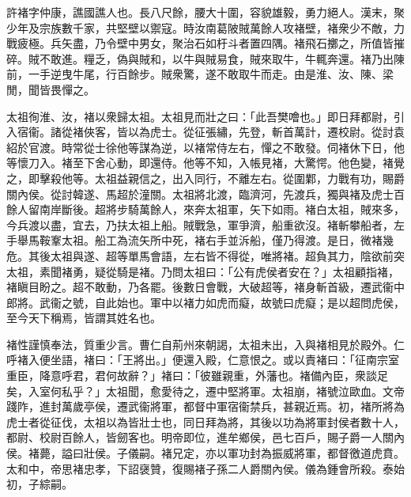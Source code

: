 
\begin{pinyinscope}
許褚字仲康，譙國譙人也。長八尺餘，腰大十圍，容貌雄毅，勇力絕人。漢末，聚少年及宗族數千家，共堅壁以禦寇。時汝南葛陂賊萬餘人攻褚壁，褚衆少不敵，力戰疲極。兵矢盡，乃令壁中男女，聚治石如杅斗者置四隅。褚飛石擲之，所值皆摧碎。賊不敢進。糧乏，偽與賊和，以牛與賊易食，賊來取牛，牛輒奔還。褚乃出陳前，一手逆曳牛尾，行百餘步。賊衆驚，遂不敢取牛而走。由是淮、汝、陳、梁閒，聞皆畏憚之。

太祖徇淮、汝，褚以衆歸太祖。太祖見而壯之曰：「此吾樊噲也。」即日拜都尉，引入宿衞。諸從褚俠客，皆以為虎士。從征張繡，先登，斬首萬計，遷校尉。從討袁紹於官渡。時常從士徐他等謀為逆，以褚常侍左右，憚之不敢發。伺褚休下日，他等懷刀入。褚至下舍心動，即還侍。他等不知，入帳見褚，大驚愕。他色變，褚覺之，即擊殺他等。太祖益親信之，出入同行，不離左右。從圍鄴，力戰有功，賜爵關內侯。從討韓遂、馬超於潼關。太祖將北渡，臨濟河，先渡兵，獨與褚及虎士百餘人留南岸斷後。超將步騎萬餘人，來奔太祖軍，矢下如雨。褚白太祖，賊來多，今兵渡以盡，宜去，乃扶太祖上船。賊戰急，軍爭濟，船重欲沒。褚斬攀船者，左手舉馬鞍鞌太祖。船工為流矢所中死，褚右手並泝船，僅乃得渡。是日，微褚幾危。其後太祖與遂、超等單馬會語，左右皆不得從，唯將褚。超負其力，陰欲前突太祖，素聞褚勇，疑從騎是褚。乃問太祖曰：「公有虎侯者安在？」太祖顧指褚，褚瞋目盼之。超不敢動，乃各罷。後數日會戰，大破超等，褚身斬首級，遷武衞中郎將。武衞之號，自此始也。軍中以褚力如虎而癡，故號曰虎癡；是以超問虎侯，至今天下稱焉，皆謂其姓名也。

褚性謹慎奉法，質重少言。曹仁自荊州來朝謁，太祖未出，入與褚相見於殿外。仁呼褚入便坐語，褚曰：「王將出。」便還入殿，仁意恨之。或以責褚曰：「征南宗室重臣，降意呼君，君何故辭？」褚曰：「彼雖親重，外藩也。褚備內臣，衆談足矣，入室何私乎？」太祖聞，愈愛待之，遷中堅將軍。太祖崩，褚號泣歐血。文帝踐阼，進封萬歲亭侯，遷武衞將軍，都督中軍宿衞禁兵，甚親近焉。初，褚所將為虎士者從征伐，太祖以為皆壯士也，同日拜為將，其後以功為將軍封侯者數十人，都尉、校尉百餘人，皆劒客也。明帝即位，進牟鄉侯，邑七百戶，賜子爵一人關內侯。褚薨，謚曰壯侯。子儀嗣。褚兄定，亦以軍功封為振威將軍，都督徼道虎賁。太和中，帝思褚忠孝，下詔襃贊，復賜褚子孫二人爵關內侯。儀為鍾會所殺。泰始初，子綜嗣。


\end{pinyinscope}